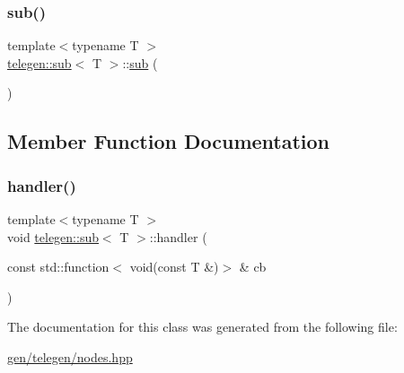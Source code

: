 \mbox{\label{classtelegen_1_1sub_aedfa8e90ccd9de1ec084e96ef42232cf}} 
\subsubsection{\texorpdfstring{sub()}{sub()}\hspace{0.1cm}{\footnotesize\ttfamily [2/2]}}
{\footnotesize\ttfamily template$<$typename T $>$ \\
\hyperlink{classtelegen_1_1sub}{telegen\+::sub}$<$ T $>$\+::\hyperlink{classtelegen_1_1sub}{sub} (\begin{DoxyParamCaption}{ }\end{DoxyParamCaption})\hspace{0.3cm}{\ttfamily [inline]}}



\subsection{Member Function Documentation}
\mbox{\label{classtelegen_1_1sub_ad1d7edeb15aea1ea4294919ae15faac2}} 
\subsubsection{\texorpdfstring{handler()}{handler()}}
{\footnotesize\ttfamily template$<$typename T $>$ \\
void \hyperlink{classtelegen_1_1sub}{telegen\+::sub}$<$ T $>$\+::handler (\begin{DoxyParamCaption}\item[{const std\+::function$<$ void(const T \&)$>$ \&}]{cb }\end{DoxyParamCaption})\hspace{0.3cm}{\ttfamily [inline]}}



The documentation for this class was generated from the following file\+:\begin{DoxyCompactItemize}
\item 
\hyperlink{gen_2telegen_2nodes_8hpp}{gen/telegen/nodes.\+hpp}\end{DoxyCompactItemize}
